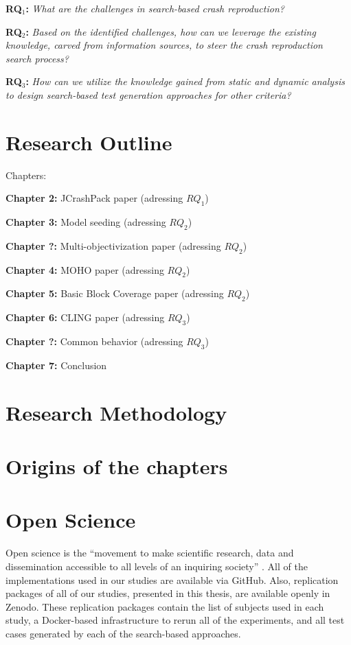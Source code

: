 \textbf{RQ$_1$: } \textit{What are the challenges in search-based crash reproduction?}

\textbf{RQ$_2$: } \textit{Based on the identified challenges, how can we leverage the existing knowledge, carved from information sources, to steer the crash reproduction search process?}

\textbf{RQ$_3$: } \textit{How can we utilize the knowledge gained from static and dynamic analysis to design search-based test generation approaches for other criteria?}


\section{Research Outline}

Chapters:

\textbf{Chapter 2: } JCrashPack paper (adressing $RQ_1$)


\textbf{Chapter 3: } Model seeding (adressing $RQ_2$)

\textbf{Chapter ?: } Multi-objectivization paper (adressing $RQ_2$)

\textbf{Chapter 4: } MOHO paper (adressing $RQ_2$)

\textbf{Chapter 5: } Basic Block Coverage paper (adressing $RQ_2$)

\textbf{Chapter 6: } CLING paper (adressing $RQ_3$)

\textbf{Chapter ?: } Common behavior (adressing $RQ_3$)

\textbf{Chapter 7: } Conclusion


\section{Research Methodology}




\section{Origins of the chapters}

\section{Open Science}

Open science is the “movement to make scientific research, data and dissemination accessible to all levels of an inquiring society” \cite{Open_science}. All of the implementations used in our studies are available via GitHub. Also, replication packages of all of our studies, presented in this thesis, are available openly in Zenodo. These replication packages contain the list of subjects used in each study, a Docker-based infrastructure to rerun all of the experiments, and all test cases generated by each of the search-based approaches.


